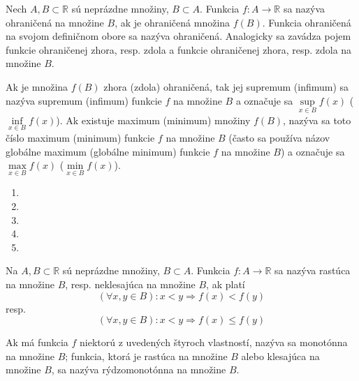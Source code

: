 Nech $A,B\subset\mathbb{R}$ sú neprázdne množiny, $B\subset A$. Funkcia
$f:A\rightarrow\mathbb{R}$ sa nazýva ohraničená na množine $B$, ak je ohraničená
množina $f(B)$. Funkcia ohraničená na svojom definičnom obore sa nazýva
ohraničená. Analogicky sa zavádza pojem funkcie ohraničenej zhora, resp. zdola a
funkcie ohraničenej zhora, resp. zdola na množine $B$.

Ak je množina $f(B)$ zhora (zdola) ohraničená, tak jej supremum (infimum) sa
nazýva supremum (infimum) funkcie $f$ na množine $B$ a označuje sa
$\sup\limits_{x\in B} f(x)$ ($\inf\limits_{x\in B} f(x)$). Ak existuje maximum
(minimum) množiny $f(B)$, nazýva sa toto číslo maximum (minimum) funkcie $f$ na
množine $B$ (často sa používa názov globálne maximum (globálne minimum) funkcie
$f$ na množine $B$) a označuje sa $\max\limits_{x\in B}f(x)$ ($\min\limits_{x\in
B}f(x)$).



\begin{enumerate}[resume]
  \item {}
  \item {}
  \item {}
  \item {}
  \item {}
\end{enumerate}

Na $A,B\subset\mathbb{R}$ sú neprázdne množiny, $B\subset A$. Funkcia
$f:A\rightarrow\mathbb{R}$ sa nazýva rastúca na množine $B$, resp. neklesajúca
na množine $B$, ak platí
\[
  (\forall x,y \in B):
    x < y \Rightarrow f(x) < f(y)
\]
resp.
\[
  (\forall x,y \in B):
    x < y \Rightarrow f(x) \leq f(y)
\]

Ak má funkcia $f$ niektorú z uvedených štyroch vlastností, nazýva sa monotónna
na množine $B$; funkcia, ktorá je rastúca na množine $B$ alebo klesajúca na
množine $B$, sa nazýva rýdzomonotónna na množine $B$.

